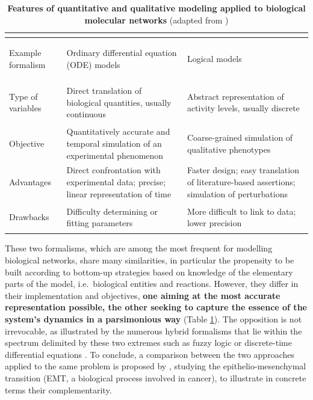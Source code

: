 \documentclass[a4paper,12pt,twoside,onecolumn,openright,final,oldfontcommands]{memoir}
\begin{document}
\begin{table}

\caption{\label{tab:odelogic}\textbf{Features of quantitative and qualitative
modeling applied to biological molecular networks} (adapted from
\citet{le2015quantitative})}
\centering
\begin{tabular}[t]{>{\bfseries\raggedright\arraybackslash}p{6em}||>{\raggedright\arraybackslash}p{12em}|>{\raggedright\arraybackslash}p{12em}}
\hline
\rowcolor[HTML]{808080}  \multicolumn{1}{c}{\textcolor{white}{\textbf{ }}} & \multicolumn{1}{c}{\textcolor{white}{\textbf{Quantitative modeling}}} & \multicolumn{1}{c}{\textcolor{white}{\textbf{Qualitative modeling}}}\\
\hline
Example formalism & Ordinary differential equation (ODE) models & Logical models\\
\hline
Type of variables & Direct translation of biological quantities, usually continuous & Abstract representation of activity levels, usually discrete\\
\hline
Objective & Quantitatively accurate and temporal simulation of an experimental phenomenon & Coarse-grained simulation of qualitative phenotypes\\
\hline
Advantages & Direct confrontation with experimental data; precise; linear representation of time & Faster design; easy translation of literature-based assertions; simulation of perturbations\\
\hline
Drawbacks & Difficulty determining or fitting parameters & More difficult to link to data; lower precision\\
\hline
\end{tabular}
\end{table}





These two formalisms, which are among the most frequent for modelling
biological networks, share many similarities, in particular the
propensity to be built according to bottom-up strategies based on
knowledge of the elementary parts of the model, i.e.~biological entities
and reactions. However, they differ in their implementation and
objectives, \textbf{one aiming at the most accurate representation
possible, the other seeking to capture the essence of the system's
dynamics in a parsimonious way} (Table \ref{tab:odelogic}). The
opposition is not irrevocable, as illustrated by the numerous hybrid
formalisms that lie within the spectrum delimited by these two extremes
such as fuzzy logic or discrete-time differential equations
\citep{le2015quantitative, calzone2018logical}. To conclude, a
comparison between the two approaches applied to the same problem is
proposed by \citet{calzone2018logical}, studying the
epithelio-mesenchymal transition (EMT, a biological process involved in
cancer), to illustrate in concrete terms their complementarity.
\end{document}
